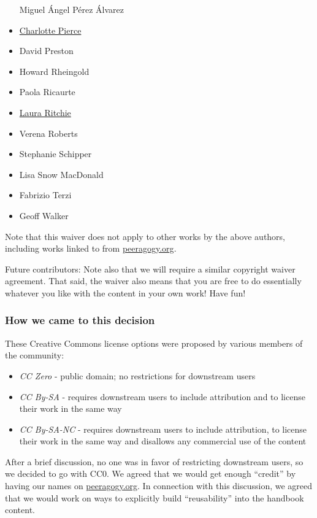 \begin{itemize}
  Miguel Ángel Pérez Álvarez
\item
  \href{http://piercepress.com}{Charlotte Pierce}
\item
  David Preston
\item
  Howard Rheingold
\item
  Paola Ricaurte
\item
  \href{http://www.lauraritchie.com/}{Laura Ritchie}
\item
  Verena Roberts
\item
  Stephanie Schipper
\item
  Lisa Snow MacDonald
\item
  Fabrizio Terzi
\item
  Geoff Walker
\end{itemize}

Note that this waiver does not apply to other works by the above
authors, including works linked to from
\href{http://peeragogy.org}{peeragogy.org}.

Future contributors: Note also that we will require a similar copyright
waiver agreement. That said, the waiver also means that you are free to
do essentially whatever you like with the content in your own work! Have
fun!

\hypertarget{how-we-came-to-this-decision}{%
\subsubsection{How we came to this
decision}\label{how-we-came-to-this-decision}}

These Creative Commons license options were proposed by various members
of the community:

\begin{itemize}
\tightlist
\item
  \emph{CC Zero} - public domain; no restrictions for downstream users
\item
  \emph{CC By-SA} - requires downstream users to include attribution and
  to license their work in the same way
\item
  \emph{CC By-SA-NC} - requires downstream users to include attribution,
  to license their work in the same way and disallows any commercial use
  of the content
\end{itemize}

After a brief discussion, no one was in favor of restricting downstream
users, so we decided to go with CC0. We agreed that we would get enough
``credit'' by having our names on
\href{http://peeragogy.org/}{peeragogy.org}. In connection with this
discussion, we agreed that we would work on ways to explicitly build
``reusability'' into the handbook content.
